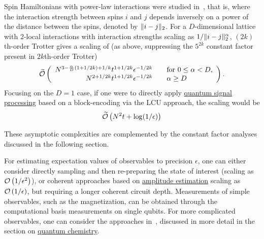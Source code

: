 \begin{refsection}
Spin Hamiltonians with power-law interactions were studied in~\cite{tran2019LocalitySimPowerLaw,childs2021TheoryTrotter}, that is, where the interaction strength between spins $i$ and $j$ depends inversely on a power of the distance between the spins, denoted by $\lVert i-j\rVert_2$. For a $D$-dimensional lattice with $2$-local interactions with interaction strengths scaling as $1/\lVert i-j\rVert_2^\alpha$, $(2k)$th-order Trotter gives a scaling of (as above, suppressing the $5^{2k}$ constant factor present in $2k$th-order Trotter)~\cite{childs2021TheoryTrotter}
\begin{equation}
		\widetilde{\mathcal{O}}\left( \begin{array}{rcl} N^{3-\frac{\alpha}{D}(1+1/2k)+1/k} t^{1+1/2k}\epsilon^{-1/2k} & &\text{for } 0 \leq \alpha < D,\\
		N^{2+1/2k} t^{1+1/2k}\epsilon^{-1/2k}& & \alpha \geq D \end{array} \right).
\end{equation}
Focusing on the $D=1$ case, if one were to directly apply \hyperref[prim:QSPqubitization]{quantum signal processing} based on a block-encoding via the LCU approach, the scaling would be
\begin{equation}
 \widetilde{\mathcal{O}}\left( N^2 t + \log(1/\epsilon) \right)
\end{equation}

These asymptotic complexities are complemented by the constant factor analyses discussed in the following section.

For estimating expectation values of observables to precision $\epsilon$, one can either consider directly sampling and then re-preparing the state of interest (scaling as $\mathcal{O}\left( 1/\epsilon^2 \right)$), or coherent approaches based on \hyperref[prim:AmpEst]{amplitude estimation} scaling as $\mathcal{O}\left( 1/\epsilon \right)$, but requiring a longer coherent circuit depth. Measurements of simple observables, such as the magnetization, can be obtained through the computational basis measurements on single qubits. For more complicated observables, one can consider the approaches in~\cite{rall2020EstimatingPhysicalQuantities,huggins2022ExpectationValue,apeldoorn2022TomographyStatePreparationUnitaries}, discussed in more detail in the section on \hyperref[appl:ElectronicStructure]{quantum chemistry}.








\end{refsection}
